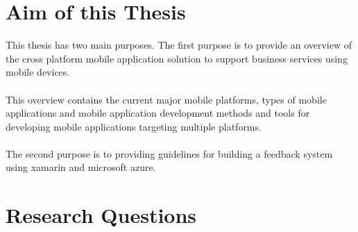 \section{Aim of this Thesis}

This thesis has two main purposes.
The first purpose is to provide an overview of the cross platform mobile application solution to support business services using mobile devices.
\paragraph{}
This overview contains the current major mobile platforms, types of mobile applications and mobile application development methods and tools for developing mobile applications targeting multiple platforms.

\paragraph{}
The second purpose is to providing guidelines for building a feedback system using xamarin and microsoft azure.



\section{Research Questions}


